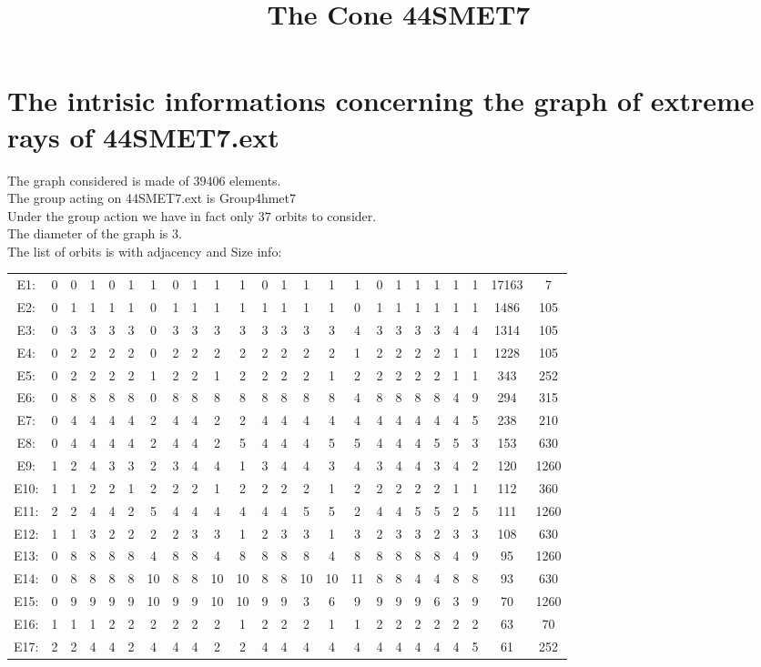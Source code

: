 \documentclass[12pt]{article}
\title{The Cone 44SMET7}
\begin{document}
\maketitle
\section{The intrisic informations concerning the graph of extreme rays of 44SMET7.ext}
The graph considered is made of $39406$ elements.\\
The group acting on 44SMET7.ext is Group4hmet7\\
Under the group action we have in fact only $37$ orbits to consider.\\
The diameter of the graph is $3$.\\
The list of orbits is with adjacency and Size info:
\begin{center}
\scriptsize
\begin{tabular}{cccccccccccccccccccccc|c|c}
E1:&0&0&1&0&1&1&0&1&1&1&0&1&1&1&1&0&1&1&1&1&1&17163&7\\
E2:&0&1&1&1&1&0&1&1&1&1&1&1&1&1&0&1&1&1&1&1&1&1486&105\\
E3:&0&3&3&3&3&0&3&3&3&3&3&3&3&3&4&3&3&3&3&4&4&1314&105\\
E4:&0&2&2&2&2&0&2&2&2&2&2&2&2&2&1&2&2&2&2&1&1&1228&105\\
E5:&0&2&2&2&2&1&2&2&1&2&2&2&2&1&2&2&2&2&2&1&1&343&252\\
E6:&0&8&8&8&8&0&8&8&8&8&8&8&8&8&4&8&8&8&8&4&9&294&315\\
E7:&0&4&4&4&4&2&4&4&2&2&4&4&4&4&4&4&4&4&4&4&5&238&210\\
E8:&0&4&4&4&4&2&4&4&2&5&4&4&4&5&5&4&4&4&5&5&3&153&630\\
E9:&1&2&4&3&3&2&3&4&4&1&3&4&4&3&4&3&4&4&3&4&2&120&1260\\
E10:&1&1&2&2&1&2&2&2&1&2&2&2&2&1&2&2&2&2&2&1&1&112&360\\
E11:&2&2&4&4&2&5&4&4&4&4&4&4&5&5&2&4&4&5&5&2&5&111&1260\\
E12:&1&1&3&2&2&2&2&3&3&1&2&3&3&1&3&2&3&3&2&3&3&108&630\\
E13:&0&8&8&8&8&4&8&8&4&8&8&8&8&4&8&8&8&8&8&4&9&95&1260\\
E14:&0&8&8&8&8&10&8&8&10&10&8&8&10&10&11&8&8&4&4&8&8&93&630\\
E15:&0&9&9&9&9&10&9&9&10&10&9&9&3&6&9&9&9&9&6&3&9&70&1260\\
E16:&1&1&1&2&2&2&2&2&2&1&2&2&2&1&1&2&2&2&2&2&2&63&70\\
E17:&2&2&4&4&2&4&4&4&2&2&4&4&4&4&4&4&4&4&4&4&5&61&252\\

\end{tabular}
\end{center}
\end{document}
